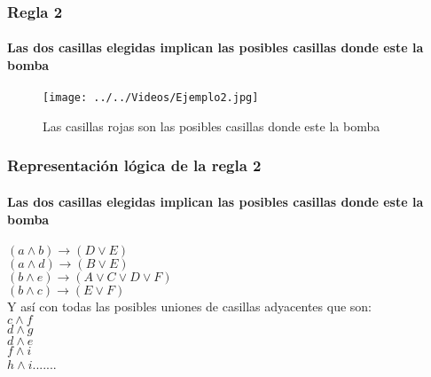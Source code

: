 \documentclass{beamer}
\begin{document}
\begin{frame}
\frametitle{Regla 2}
\framesubtitle{Las dos casillas elegidas implican las posibles casillas donde este la bomba}


\begin{figure}[hbtp]
\centering
\texttt{[image: ../../Videos/Ejemplo2.jpg]}
\caption{Las casillas rojas son las posibles casillas donde este la bomba}
\end{figure}



\end{frame}

\begin{frame}
\frametitle{Representación lógica de la regla 2}
\framesubtitle{Las dos casillas elegidas implican las posibles casillas donde este la bomba}

$(a\wedge{b}) \rightarrow {(D \lor{E})}$\\
$(a\wedge{d}) \rightarrow {(B \lor{E})}$\\
$(b\wedge{e}) \rightarrow {(A \lor{C} \lor{D}\lor{F})}$\\
$(b\wedge{c}) \rightarrow {(E \lor{F} )}$\\
Y así con todas las posibles uniones de casillas adyacentes que son:\\
$c \wedge{ f} $\\
$d \wedge{ g} $\\
$d \wedge{ e} $\\
$f \wedge{ i} $\\
$h \wedge{ i} $.......\\

\end{frame}
\end{document}
